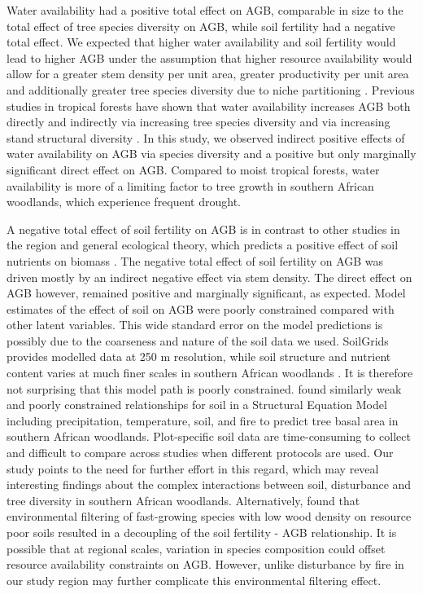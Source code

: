 \begin{refsection}
Water availability had a positive total effect on AGB, comparable in size to the total effect of tree species diversity on AGB, while soil fertility had a negative total effect. We expected that higher water availability and soil fertility would lead to higher AGB under the assumption that higher resource availability would allow for a greater stem density per unit area, greater productivity per unit area and additionally greater tree species diversity due to niche partitioning \citep{Kraaij2006, Shirima2015b}. Previous studies in tropical forests have shown that water availability increases AGB both directly and indirectly via increasing tree species diversity and via increasing stand structural diversity \citep{Ali2019a, Ali2019b, Poorter2017}. In this study, we observed indirect positive effects of water availability on AGB via species diversity and a positive but only marginally significant direct effect on AGB. Compared to moist tropical forests, water availability is more of a limiting factor to tree growth in southern African woodlands, which experience frequent drought. 

A negative total effect of soil fertility on AGB is in contrast to other studies in the region and general ecological theory, which predicts a positive effect of soil nutrients on biomass \citep{Scarascia2000}. The negative total effect of soil fertility on AGB was driven mostly by an indirect negative effect via stem density. The direct effect on AGB however, remained positive and marginally significant, as expected. Model estimates of the effect of soil on AGB were poorly constrained compared with other latent variables. This wide standard error on the model predictions is possibly due to the coarseness and nature of the soil data we used. SoilGrids provides modelled data at 250 m resolution, while soil structure and nutrient content varies at much finer scales in southern African woodlands \citep{Muledi2017, Bucini2007}. It is therefore not surprising that this model path is poorly constrained. \citet{Lehmann2014} found similarly weak and poorly constrained relationships for soil in a Structural Equation Model including precipitation, temperature, soil, and fire to predict tree basal area in southern African woodlands. Plot-specific soil data are time-consuming to collect and difficult to compare across studies when different protocols are used. Our study points to the need for further effort in this regard, which may reveal interesting findings about the complex interactions between soil, disturbance and tree diversity in southern African woodlands. Alternatively, \citet{Gourlet2011} found that environmental filtering of fast-growing species with low wood density on resource poor soils resulted in a decoupling of the soil fertility - AGB relationship. It is possible that at regional scales, variation in species composition could offset resource availability constraints on AGB. However, unlike \citet{Gourlet2011} disturbance by fire in our study region may further complicate this environmental filtering effect.


\end{refsection}
